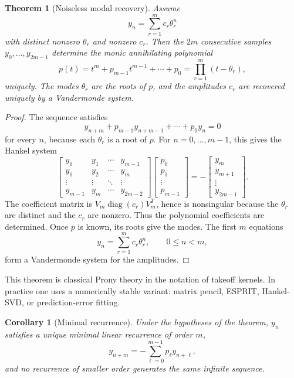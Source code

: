 \documentclass[10pt,twocolumn]{article}
\newtheorem{theorem}{Theorem}
\newtheorem{corollary}{Corollary}
\begin{document}
\begin{theorem}[Noiseless modal recovery]
Assume
\[
        y_n=\sum_{r=1}^{m}c_r\theta_r^n
\]
with distinct nonzero \(\theta_r\) and nonzero \(c_r\). Then the \(2m\)
consecutive samples \(y_0,\ldots,y_{2m-1}\) determine the monic annihilating
polynomial
\[
        p(t)=t^m+p_{m-1}t^{m-1}+\cdots+p_0
        =
        \prod_{r=1}^{m}(t-\theta_r),
\]
uniquely. The modes \(\theta_r\) are the roots of \(p\), and the amplitudes
\(c_r\) are recovered uniquely by a Vandermonde system.
\end{theorem}

\begin{proof}
The sequence satisfies
\[
        y_{n+m}+p_{m-1}y_{n+m-1}+\cdots+p_0y_n=0
\]
for every \(n\), because each \(\theta_r\) is a root of \(p\). For
\(n=0,\ldots,m-1\), this gives the Hankel system
\[
        \begin{bmatrix}
        y_0 & y_1 & \cdots & y_{m-1}\\
        y_1 & y_2 & \cdots & y_m\\
        \vdots & \vdots & \ddots & \vdots\\
        y_{m-1} & y_m & \cdots & y_{2m-2}
        \end{bmatrix}
        \begin{bmatrix}
        p_0\\ p_1\\ \vdots\\ p_{m-1}
        \end{bmatrix}
        =
        -
        \begin{bmatrix}
        y_m\\ y_{m+1}\\ \vdots\\ y_{2m-1}
        \end{bmatrix}.
\]
The coefficient matrix is \(V_m\operatorname{diag}(c_r)V_m^T\), hence is
nonsingular because the \(\theta_r\) are distinct and the \(c_r\) are nonzero.
Thus the polynomial coefficients are determined. Once \(p\) is known, its roots
give the modes. The first \(m\) equations
\[
        y_n=\sum_{r=1}^{m}c_r\theta_r^n,
        \qquad 0\le n<m,
\]
form a Vandermonde system for the amplitudes.
\end{proof}

This theorem is classical Prony theory in the notation of takeoff kernels. In
practice one uses a numerically stable variant: matrix pencil, ESPRIT,
Hankel-SVD, or prediction-error fitting.

\begin{corollary}[Minimal recurrence]
Under the hypotheses of the theorem, \(y_n\) satisfies a unique minimal linear
recurrence of order \(m\),
\[
        y_{n+m}
        =
        -\sum_{\ell=0}^{m-1}p_\ell y_{n+\ell},
\]
and no recurrence of smaller order generates the same infinite sequence.
\end{corollary}
\end{document}
